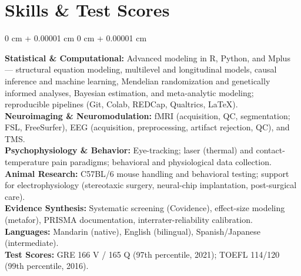 \documentclass[10pt, letterpaper]{article}
\newenvironment{onecolentry}{
    \begin{adjustwidth}{
        0 cm + 0.00001 cm
    }{
        0 cm + 0.00001 cm
    }
}{
    \end{adjustwidth}
} %
\begin{document}
\vspace{3.75pt}
\section*{Skills \& Test Scores}
\begin{onecolentry}
\textbf{Statistical \& Computational:} Advanced modeling in R, Python, and Mplus — structural equation modeling, multilevel and longitudinal models, causal inference and machine learning, Mendelian randomization and genetically informed analyses, Bayesian estimation, and meta-analytic modeling; reproducible pipelines (Git, Colab, REDCap, Qualtrics, \LaTeX{}).\\[1pt]
\textbf{Neuroimaging \& Neuromodulation:} fMRI (acquisition, QC, segmentation; FSL, FreeSurfer), EEG (acquisition, preprocessing, artifact rejection, QC), and TMS.\\[1pt]
\textbf{Psychophysiology \& Behavior:} Eye-tracking; laser (thermal) and contact-temperature pain paradigms; behavioral and physiological data collection.\\[1pt]
\textbf{Animal Research:} C57BL/6 mouse handling and behavioral testing; support for electrophysiology (stereotaxic surgery, neural-chip implantation, post-surgical care).\\[1pt]
\textbf{Evidence Synthesis:} Systematic screening (Covidence), effect-size modeling (metafor), PRISMA documentation, interrater-reliability calibration.\\[1pt]
\textbf{Languages:} Mandarin (native), English (bilingual), Spanish/Japanese (intermediate).\\[1pt]
\textbf{Test Scores:} GRE 166 V / 165 Q (97th percentile, 2021); TOEFL 114/120 (99th percentile, 2016).
\end{onecolentry}

\vspace{3.75pt}
\end{document}
